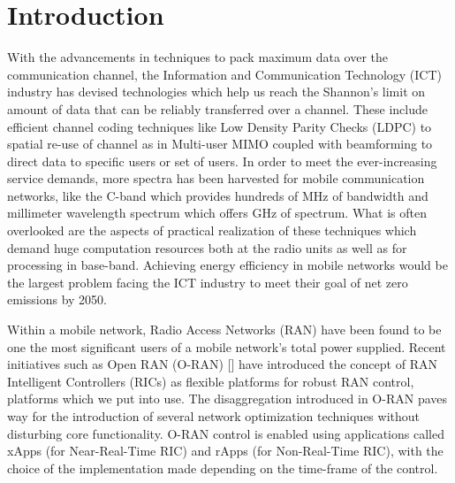 \section{Introduction}
\label{sec:intro}

With the advancements in techniques to pack maximum data over the communication channel, the Information and Communication Technology (ICT) industry has devised technologies which help us reach the Shannon’s limit on amount of data that can be reliably transferred over a channel. 
These include efficient channel coding techniques like Low Density Parity Checks (LDPC) to spatial re-use of channel as in Multi-user MIMO coupled with beamforming to direct data to specific users or set of users. 
In order to meet the ever-increasing service demands, more spectra has been harvested for mobile communication networks, like the C-band which provides hundreds of MHz of bandwidth and millimeter wavelength spectrum which offers GHz of spectrum. 
What is often overlooked are the aspects of practical realization of these techniques which demand huge computation resources both at the radio units as well as for processing in base-band. 
Achieving energy efficiency in mobile networks would be the largest problem facing the ICT industry to meet their goal of net zero emissions by 2050. 

Within a mobile network, Radio Access Networks (RAN) have been found to be one the most significant users of a mobile network's total power supplied.
Recent initiatives such as Open RAN (O-RAN) [] have introduced the concept of RAN Intelligent Controllers (RICs) as flexible platforms for robust RAN control, platforms which we put into use.
The disaggregation introduced in O-RAN paves way for the introduction of several network optimization techniques without disturbing  core functionality.
O-RAN control is enabled using applications called xApps (for Near-Real-Time RIC) and rApps (for Non-Real-Time RIC), with the choice of the implementation made depending on the time-frame of the control.

